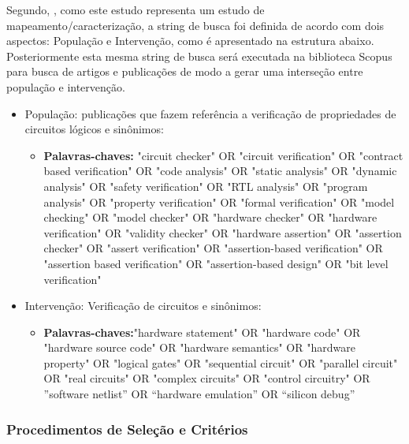 Segundo, \cite{rocha2015verificaccao}, como este estudo representa um estudo de mapeamento/caracterização, a string de busca foi definida de acordo com dois aspectos: População e Intervenção, como é apresentado na estrutura abaixo. Posteriormente esta mesma string de busca será executada na biblioteca Scopus para busca de artigos e publicações de modo a gerar uma interseção entre população e intervenção.
\begin{itemize}
\item População: publicações que fazem referência a verificação de propriedades de circuitos lógicos e sinônimos:
	\begin{itemize}
	\item \textbf{Palavras-chaves:} "circuit checker" OR "circuit verification" OR "contract based verification" OR "code analysis" OR "static analysis" OR "dynamic analysis" OR "safety verification" OR "RTL analysis" OR "program analysis" OR "property verification" OR "formal verification" OR "model checking" OR "model checker" OR "hardware checker" OR "hardware verification" OR "validity checker" OR "hardware assertion" OR "assertion checker" OR "assert verification" OR "assertion-based verification" OR "assertion based verification" OR "assertion-based design" OR "bit level verification"
	\end{itemize}
\item Intervenção: Verificação de circuitos e sinônimos:
	\begin{itemize}
	\item \textbf{Palavras-chaves:}"hardware statement" OR "hardware code" OR "hardware source code" OR "hardware semantics" OR "hardware property" OR "logical gates" OR "sequential circuit" OR "parallel circuit" OR "real circuits" OR "complex circuits" OR "control circuitry" OR ”software netlist” OR “hardware emulation” OR “silicon debug”
	\end{itemize}
\end{itemize}
\subsubsection{Procedimentos de Seleção e Critérios}

